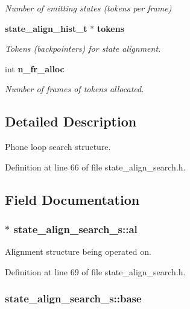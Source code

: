 \begin{DoxyCompactItemize}
\begin{DoxyCompactList}\small\item\em Number of emitting states (tokens per frame) \end{DoxyCompactList}\item 
{\bf state\+\_\+align\+\_\+hist\+\_\+t} $\ast$ {\bf tokens}
\begin{DoxyCompactList}\small\item\em Tokens (backpointers) for state alignment. \end{DoxyCompactList}\item 
int {\bf n\+\_\+fr\+\_\+alloc}
\begin{DoxyCompactList}\small\item\em Number of frames of tokens allocated. \end{DoxyCompactList}\end{DoxyCompactItemize}


\subsection{Detailed Description}
Phone loop search structure. 

Definition at line 66 of file state\+\_\+align\+\_\+search.\+h.



\subsection{Field Documentation}
\subsubsection[{al}]{$\ast$ state\+\_\+align\+\_\+search\+\_\+s\+::al}\label{structstate__align__search__s_a47b9b509c7416f8952ee452d8ce7dda6}


Alignment structure being operated on. 



Definition at line 69 of file state\+\_\+align\+\_\+search.\+h.

\subsubsection[{base}]{ state\+\_\+align\+\_\+search\+\_\+s\+::base}\label{structstate__align__search__s_ab2a596d687e113c88a271d1397b8d9c5}


